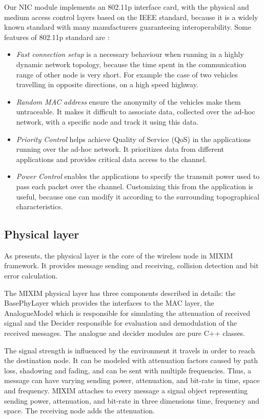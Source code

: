 Our NIC module implements an 802.11p interface card, with the physical and
medium access control layers based on the IEEE standard, because it is a widely
known standard with many manufacturers guaranteeing interoperability. Some
features of 802.11p standard are \cite{phule2012public}:
 
\begin{itemize}
  \item {\it Fast connection setup} is a necessary behaviour when running in a
  highly dynamic network topology, because the time spent in the communication
  range of other node is very short. For example the case of two vehicles
  travelling in opposite directions, on a high speed highway.
  \item {\it Random MAC address} ensure the anonymity of the vehicles make them
  untraceable. It makes it difficult to associate data, collected over the
  ad-hoc network, with a specific node and track it using this data.
  \item {\it Priority Control} helps achieve Quality of Service (QoS) in the
  applications running over the ad-hoc network. It prioritizes data from
  different applications and provides critical data access to the channel.
  \item{\it Power Control} enables the applications to specify the transmit
  power used to pass each packet over the channel. Customizing this from the
  application is useful, because one can modify it according to the surrounding
  topographical characteristics.
\end{itemize}



\subsection{Physical layer}

As \cite{Kopke} presents, the physical layer is the core of the wireless node in
MIXIM framework. It provides message sending and receiving, collision detection
and bit error calculation.

The MIXIM physical layer has three components described in details: the
BasePhyLayer which provides the interfaces to the MAC layer, the AnalogueModel
which is responsible for simulating the attenuation of received signal and the
Decider responsible for evaluation and demodulation of the received messages.
The analogue and decider modules are pure C++ classes.

The signal strength is influenced by the environment it travels in order to
reach the destination node. It can be modeled with attenuation factors caused by
path loss, shadowing and fading, and can be sent with multiple frequencies.
Thus, a message can have varying sending power, attenuation, and bit-rate in
time, space and frequency. MIXIM attaches to every message a signal object
representing sending power, attenuation, and bit-rate in three dimensions time,
frequency and space. The receiving node adds the attenuation.

